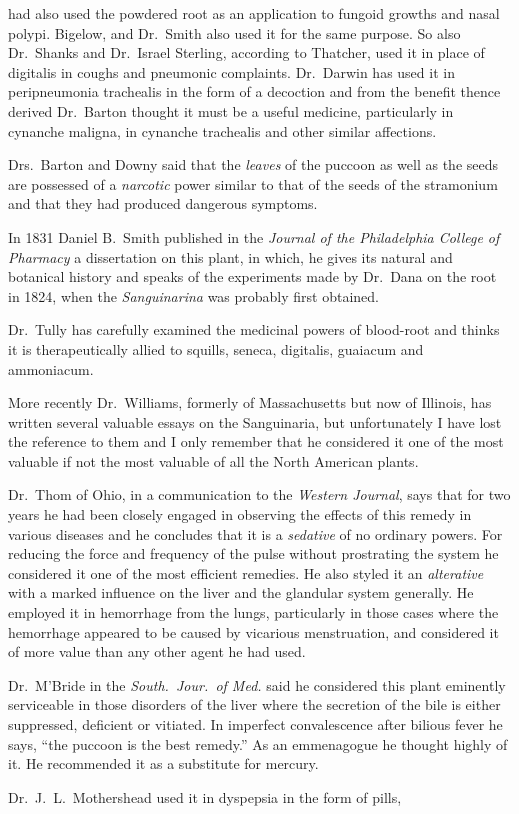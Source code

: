 had also used the powdered root as an application to fungoid growths
and nasal polypi. Bigelow, and Dr.\ Smith also used it for the same
purpose. So also Dr.\ Shanks and Dr.\ Israel Sterling, according to
Thatcher, used it in place of digitalis in coughs and pneumonic complaints.
Dr.\ Darwin has used it in peripneumonia trachealis in the
form of a decoction and from the benefit thence derived Dr.\ Barton
thought it must be a useful medicine, particularly in cynanche maligna,
in cynanche trachealis and other similar affections.

Drs.\ Barton and Downy said that the \emph{leaves} of the puccoon as well as
the seeds are possessed of a \emph{narcotic} power similar to that of the seeds
of the stramonium and that they had produced dangerous symptoms.

In 1831 Daniel B.\ Smith published in the \emph{Journal of the Philadelphia
College of Pharmacy} a dissertation on this plant, in which,
he gives its natural and botanical history and speaks of the experiments
made by Dr.\ Dana on the root in 1824, when the \emph{Sanguinarina} was
probably first obtained.

Dr.\ Tully has carefully examined the medicinal powers of blood-root
and thinks it is therapeutically allied to squills, seneca, digitalis, guaiacum
and ammoniacum.

More recently Dr.\ Williams, formerly of Massachusetts but now of
Illinois, has written several valuable essays on the Sanguinaria, but
unfortunately I have lost the reference to them and I only remember
that he considered it one of the most valuable if not the most valuable
of all the North American plants.

Dr.\ Thom of Ohio, in a communication to the \emph{Western Journal},
says that for two years he had been closely engaged in observing the
effects of this remedy in various diseases and he concludes that it is a
\emph{sedative} of no ordinary powers. For reducing the force and frequency
of the pulse without prostrating the system he considered it one of the
most efficient remedies. He also styled it an \emph{alterative} with a marked
influence on the liver and the glandular system generally. He employed
it in hemorrhage from the lungs, particularly in those cases where
the hemorrhage appeared to be caused by vicarious menstruation, and
considered it of more value than any other agent he had used.

Dr.\ M'Bride in the \emph{South.\ Jour.\ of Med.} said he considered this
plant eminently serviceable in those disorders of the liver where the
secretion of the bile is either suppressed, deficient or vitiated. In imperfect
convalescence after bilious fever he says, ``the puccoon is the
best remedy.'' As an emmenagogue he thought highly of it. He
recommended it as a substitute for mercury.

Dr.\ J.\ L.\ Mothershead used it in dyspepsia in the form of pills,\endinput

